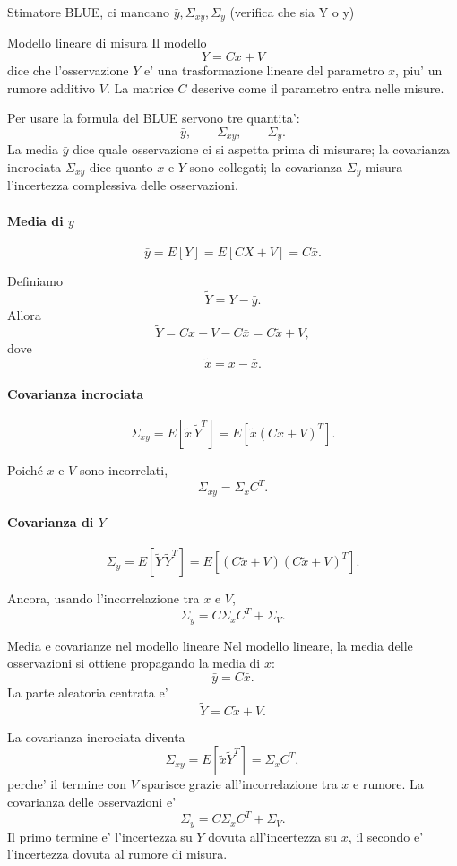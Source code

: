\documentclass[11pt,a4paper]{article}
\begin{document}
Stimatore BLUE, ci mancano $\bar y, \Sigma_{xy}, \Sigma_y$ (verifica che sia Y o y)

\begin{spiegazione}{Modello lineare di misura}
Il modello
\[
Y=Cx+V
\]
dice che l'osservazione $Y$ e' una trasformazione lineare del parametro $x$, piu' un rumore additivo $V$. La matrice $C$ descrive come il parametro entra nelle misure.

Per usare la formula del BLUE servono tre quantita':
\[
\bar y,\qquad \Sigma_{xy},\qquad \Sigma_y.
\]
La media $\bar y$ dice quale osservazione ci si aspetta prima di misurare; la covarianza incrociata $\Sigma_{xy}$ dice quanto $x$ e $Y$ sono collegati; la covarianza $\Sigma_y$ misura l'incertezza complessiva delle osservazioni.
\end{spiegazione}

\paragraph{Media di \(y\)}
\[
\bar y = E[Y]=E[CX+V]=C\bar x.
\]

Definiamo
\[
\tilde Y = Y-\bar y.
\]
Allora
\[
\tilde Y
=
Cx+V-C\bar x
=
C\tilde x+V,
\]
dove
\[
\tilde x=x-\bar x.
\]

\paragraph{Covarianza incrociata}
\[
\Sigma_{xy}
=
E[\tilde x\,\tilde Y^T]
=
E\!\left[\tilde x(C\tilde x+V)^T\right].
\]

Poiché \(x\) e \(V\) sono incorrelati,
\[
\Sigma_{xy}
=
\Sigma_x C^T.
\]

\paragraph{Covarianza di \(Y\)}
\[
\Sigma_y
=
E[\tilde Y\,\tilde Y^T]
=
E\!\left[(C\tilde x+V)(C\tilde x+V)^T\right].
\]

Ancora, usando l'incorrelazione tra \(x\) e \(V\),
\[
\Sigma_y
=
C\Sigma_x C^T+\Sigma_V.
\]

\begin{spiegazione}{Media e covarianze nel modello lineare}
Nel modello lineare, la media delle osservazioni si ottiene propagando la media di $x$:
\[
\bar y=C\bar x.
\]
La parte aleatoria centrata e'
\[
\tilde Y=C\tilde x+V.
\]

La covarianza incrociata diventa
\[
\Sigma_{xy}=E[\tilde x\tilde Y^T]=\Sigma_x C^T,
\]
perche' il termine con $V$ sparisce grazie all'incorrelazione tra $x$ e rumore. La covarianza delle osservazioni e'
\[
\Sigma_y=C\Sigma_xC^T+\Sigma_V.
\]
Il primo termine e' l'incertezza su $Y$ dovuta all'incertezza su $x$, il secondo e' l'incertezza dovuta al rumore di misura.
\end{spiegazione}
\end{document}
